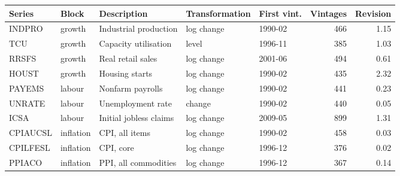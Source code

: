 \begin{tabular}{lllllrr}
\toprule
Series & Block & Description & Transformation & First vint. & Vintages & Revision \\
\midrule
INDPRO & growth & Industrial production & log change & 1990-02 & 466 & 1.15 \\
TCU & growth & Capacity utilisation & level & 1996-11 & 385 & 1.03 \\
RRSFS & growth & Real retail sales & log change & 2001-06 & 494 & 0.61 \\
HOUST & growth & Housing starts & log change & 1990-02 & 435 & 2.32 \\
PAYEMS & labour & Nonfarm payrolls & log change & 1990-02 & 441 & 0.23 \\
UNRATE & labour & Unemployment rate & change & 1990-02 & 440 & 0.05 \\
ICSA & labour & Initial jobless claims & log change & 2009-05 & 899 & 1.31 \\
CPIAUCSL & inflation & CPI, all items & log change & 1990-02 & 458 & 0.03 \\
CPILFESL & inflation & CPI, core & log change & 1996-12 & 376 & 0.02 \\
PPIACO & inflation & PPI, all commodities & log change & 1996-12 & 367 & 0.14 \\
\bottomrule
\end{tabular}
